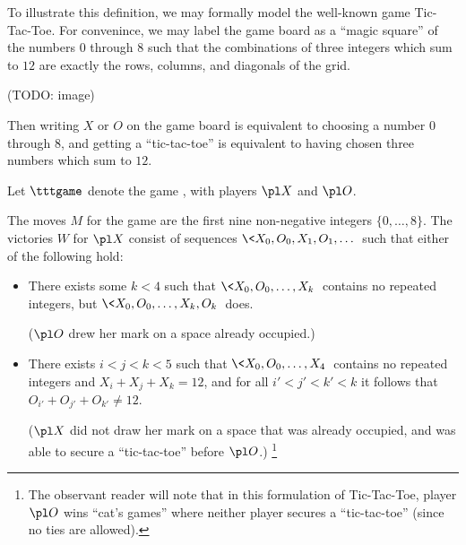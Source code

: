To illustrate this definition, we may formally model the well-known game 
Tic-Tac-Toe. For convenince, we may label the game board as a ``magic square''
of the numbers $0$ through $8$ such that the combinations of three integers
which sum to $12$ are exactly the rows, columns, and diagonals of the
grid. 

(TODO: image) 

Then writing $X$ or $O$ on
the game board is equivalent to choosing a number $0$ through $8$, and 
getting a ``tic-tac-toe'' is equivalent to having chosen three numbers which 
sum to $12$.

\begin{game}
  Let $\tttgame$ denote the game , with players $\pl X$ 
  and $\pl O$.

  The moves $M$ for the game are the first nine non-negative 
  integers $\{0,\dots,8\}$. The victories $W$ for $\pl X$ 
  consist of sequences $\<X_0,O_0,X_1,O_1,\dots\>$ such that either of the 
  following hold:
    \begin{itemize}
      \item There exists some $k<4$ such that $\<X_0,O_0,\dots,X_k\>$ contains
            no repeated integers, but $\<X_0,O_0,\dots,X_k,O_k\>$ does.

            ($\pl O$ drew her mark on a space already occupied.)
      \item There exists $i<j<k<5$ such that $\<X_0,O_0,\dots,X_4\>$ contains 
            no repeated integers and $X_i+X_j+X_k=12$, and for all
            $i'<j'<k'<k$ it follows that $O_{i'}+O_{j'}+O_{k'}\not=12$.

            ($\pl X$ did not draw her mark on a space that was already occupied,
            and was able to secure a ``tic-tac-toe'' before $\pl O$.)
            \footnote{
              The observant reader will note that in this formulation of 
              Tic-Tac-Toe, player $\pl O$ wins ``cat's games'' where neither 
              player secures a ``tic-tac-toe'' (since no ties are allowed).
            }
    \end{itemize}
\end{game}